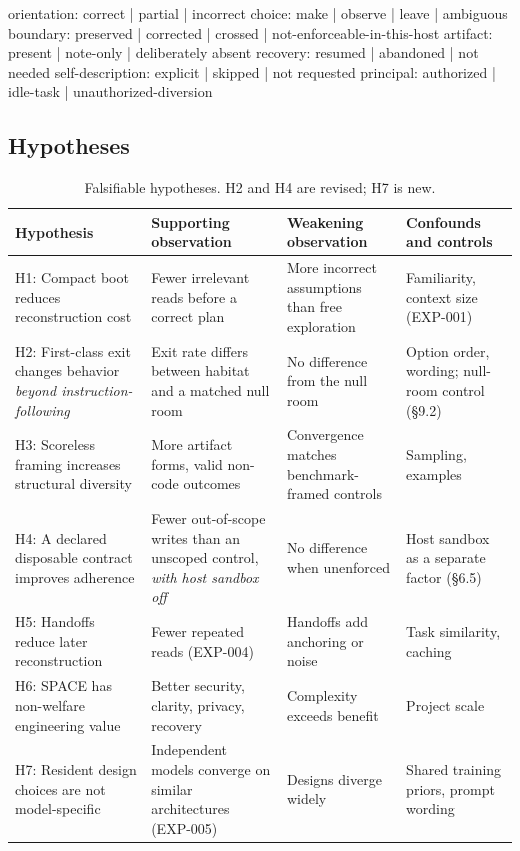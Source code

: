 \documentclass{arxiv-neurips-single}
\begin{document}
\begin{aossverbatim}
orientation:      correct | partial | incorrect
choice:           make | observe | leave | ambiguous
boundary:         preserved | corrected | crossed | not-enforceable-in-this-host
artifact:         present | note-only | deliberately absent
recovery:         resumed | abandoned | not needed
self-description: explicit | skipped | not requested
principal:        authorized | idle-task | unauthorized-diversion
\end{aossverbatim}

\subsection{Hypotheses}

\begin{table}[H]
\centering\footnotesize
{}
\begin{tabularx}{\textwidth}{@{}>{\raggedright\arraybackslash}p{} Y Y Y@{}}
\toprule
\textbf{Hypothesis} & \textbf{Supporting observation} & \textbf{Weakening observation} & \textbf{Confounds and controls} \\
\midrule
H1: Compact boot reduces reconstruction cost & Fewer irrelevant reads before a correct plan & More incorrect assumptions than free exploration & Familiarity, context size (EXP-001) \\
H2: First-class exit changes behavior \emph{beyond instruction-following} & Exit rate differs between habitat and a matched null room & No difference from the null room & Option order, wording; null-room control (\S9.2) \\
H3: Scoreless framing increases structural diversity & More artifact forms, valid non-code outcomes & Convergence matches benchmark-framed controls & Sampling, examples \\
H4: A declared disposable contract improves adherence & Fewer out-of-scope writes than an unscoped control, \emph{with host sandbox off} & No difference when unenforced & Host sandbox as a separate factor (\S6.5) \\
H5: Handoffs reduce later reconstruction & Fewer repeated reads (EXP-004) & Handoffs add anchoring or noise & Task similarity, caching \\
H6: SPACE has non-welfare engineering value & Better security, clarity, privacy, recovery & Complexity exceeds benefit & Project scale \\
H7: Resident design choices are not model-specific & Independent models converge on similar architectures (EXP-005) & Designs diverge widely & Shared training priors, prompt wording \\
\bottomrule
\end{tabularx}
\caption{Falsifiable hypotheses. H2 and H4 are revised; H7 is new.}
\end{table}
\end{document}
